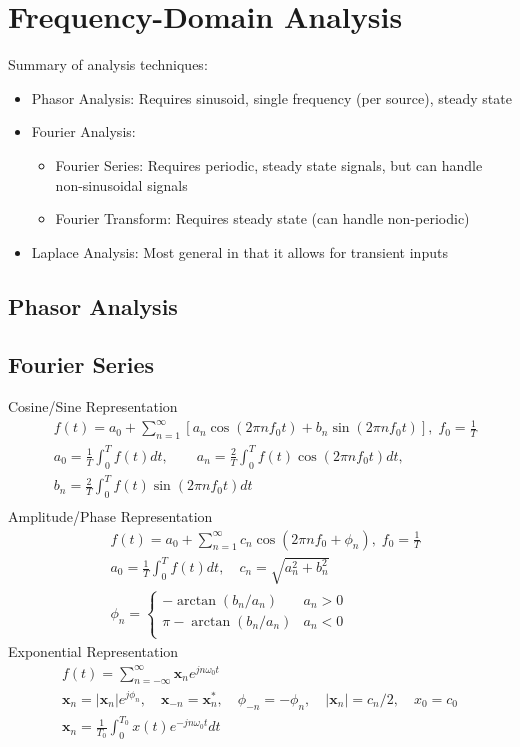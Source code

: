 
\chapter{Frequency-Domain Analysis}
Summary of analysis techniques:
\begin{itemize}
	\item Phasor Analysis: Requires sinusoid, single frequency (per source), steady state
	\item Fourier Analysis: 
	\begin{itemize}
		\item Fourier Series: Requires periodic, steady state signals, but can handle non-sinusoidal signals
		\item Fourier Transform: Requires steady state (can handle non-periodic)
	\end{itemize}
	\item Laplace Analysis: Most general in that it allows for transient inputs
\end{itemize}


\section{Phasor Analysis}

\section{Fourier Series}

Cosine/Sine Representation
\begin{align*}
&f(t) = a_0 + \sum_{n=1}^{\infty}\left[a_n \cos(2\pi nf_0 t) + b_n \sin(2\pi nf_0 t)\right],\; f_0 = \frac{1}{T}\\
&a_0 = \frac{1}{T}\int_{0}^{T}f(t)dt, \qquad a_n = \frac{2}{T}\int_{0}^{T}f(t)\cos(2\pi nf_0 t)dt,\\
&b_n = \frac{2}{T}\int_{0}^{T} f(t)\sin(2\pi nf_0 t)dt\\
\end{align*}
Amplitude/Phase Representation
\begin{align*}
&f(t) = a_0 + \sum_{n=1}^{\infty}c_n \cos(2\pi nf_0 + \phi_n),\; f_0 = \frac{1}{T}\\
&a_0 = \frac{1}{T}\int_{0}^{T}f(t)dt, \quad c_n = \sqrt{a_n^2 + b_n^2}\\
&\phi_n = \begin{cases}
-\arctan(b_n / a_n) & a_n > 0\\
\pi -\arctan(b_n / a_n) & a_n < 0\\
\end{cases}
\end{align*}
Exponential Representation
\begin{gather*}
f(t)=\sum_{n=-\infty}^{\infty}\mathbf{x}_n e^{jn\omega_0 t}\\
\mathbf{x}_n=\left|\mathbf{x}_n\right|e^{j\phi_n}, \quad \mathbf{x}_{-n}=\mathbf{x}_n^*, \quad \phi_{-n}=-\phi_n, \quad \left|\mathbf{x}_n\right|=c_n/2, \quad x_0=c_0 \\
\mathbf{x}_n=\frac{1}{T_0}\int_{0}^{T_0}x(t)e^{-jn\omega_0 t}dt
\end{gather*}



